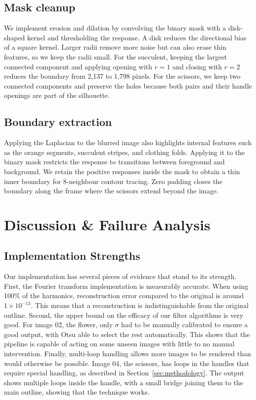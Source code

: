 \documentclass[conference]{IEEEtran}
\begin{document}
\subsection{Mask cleanup}
We implement erosion and dilation by convolving the binary mask with a
disk-shaped kernel and thresholding the response. A disk reduces the
directional bias of a square kernel. Larger radii remove more noise but
can also erase thin features, so we keep the radii small. For the
succulent, keeping the largest connected component and applying opening
with $r=1$ and closing with $r=2$ reduces the boundary from 2,137 to
1,798 pixels. For the scissors, we keep two connected components and
preserve the holes because both pairs and their handle openings are
part of the silhouette.

\subsection{Boundary extraction}
Applying the Laplacian to the blurred image also highlights internal
features such as the orange segments, succulent stripes, and clothing
folds. Applying it to the binary mask restricts the response to
transitions between foreground and background. We retain the positive
responses inside the mask to obtain a thin inner boundary for
8-neighbour contour tracing. Zero padding closes the boundary along the
frame where the scissors extend beyond the image.

\section{Discussion \& Failure Analysis}



\subsection{Implementation Strengths}

Our implementation has several pieces of evidence that stand to its strength. First, the Fourier transform implementation is measurably accurate. When using 100\% of the harmonics, reconstruction error compared to the original is around $1 \times 10^{-13}$. This means that a reconstruction is indistinguishable from the original outline. Second, the upper bound on the efficacy of our filter algorithms is very good. For image 02, the flower, only $\sigma$ had to be manually calibrated to ensure a good output, with Otsu able to select the rest automatically. This shows that the pipeline is capable of acting on some unseen images with little to no manual intervention. Finally, multi-loop handling allows more images to be rendered than would otherwise be possible. Image 04, the scissors, has loops in the handles that require special handling, as described in Section~\ref{sec:methodology}. The output shows multiple loops inside the handle, with a small bridge joining them to the main outline, showing that the technique works.
\end{document}

